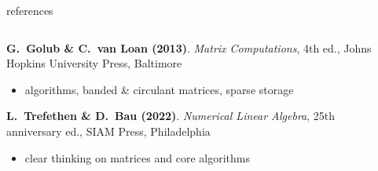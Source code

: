 \documentclass[10pt,
               svgnames,
               hyperref={colorlinks,citecolor=DeepPink4,linkcolor=FireBrick,urlcolor=Maroon},
               usepdftitle=false]{beamer}
\begin{document}
\begin{frame}{references}

\begin{columns}
\begin{column}{0.8\textwidth}
\begin{itemize}
{\small
\item[] \textbf{G.~Golub \& C.~van Loan (2013)}. \emph{Matrix Computations}, 4th ed., Johns Hopkins University Press, Baltimore
    \begin{itemize}
    \item[$\circ$] algorithms, banded \& circulant matrices, sparse storage
    \end{itemize}
\item[] \textbf{L.~Trefethen \& D.~Bau (2022)}. \emph{Numerical Linear Algebra}, 25th anniversary ed., SIAM Press, Philadelphia
    \begin{itemize}
    \item[$\circ$] clear thinking on matrices and core algorithms
    \end{itemize}
}
\end{itemize}
\end{column}
\begin{column}{0.17\textwidth}


\end{column}
\end{columns}
\end{frame}
\end{document}
